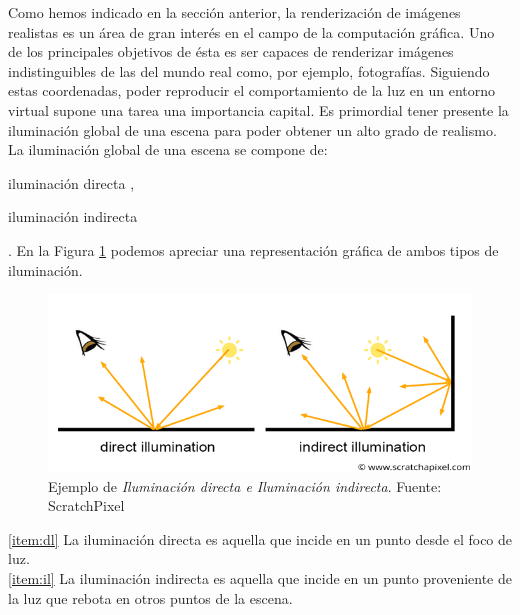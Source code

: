 \documentclass[titlepage,12pt]{report}
\begin{document}
Como hemos indicado en la sección anterior, la renderización de imágenes realistas es un área de gran interés en el campo de la computación gráfica. Uno de los principales objetivos de ésta es ser capaces de renderizar imágenes indistinguibles de las del mundo real como, por ejemplo, fotografías. Siguiendo estas coordenadas, poder reproducir el comportamiento de la luz en un entorno virtual supone una tarea una importancia capital. Es primordial tener presente la iluminación global de una escena para poder obtener un alto grado de realismo. La iluminación global de una escena se compone de: \begin{enumerate*}[label=\roman*)] \item iluminación directa \label{item:dl}, \item iluminación indirecta \label{item:il} \end{enumerate*}. En la Figura \ref{globalil} podemos apreciar una representación gráfica de ambos tipos de iluminación.

\begin{figure}[!ht]
	\centering
	\includegraphics[scale=0.45]{media/shad2-globalillum3.png}
	\caption{Ejemplo de \textit{Iluminación directa e Iluminación indirecta}. Fuente: ScratchPixel}
	\label{globalil}
\end{figure}

\ref{item:dl} La iluminación directa es aquella que incide en un punto desde el foco de luz. \\
\ref{item:il} La iluminación indirecta es aquella que incide en un punto proveniente de la luz que rebota en otros puntos de la escena.
\end{document}
